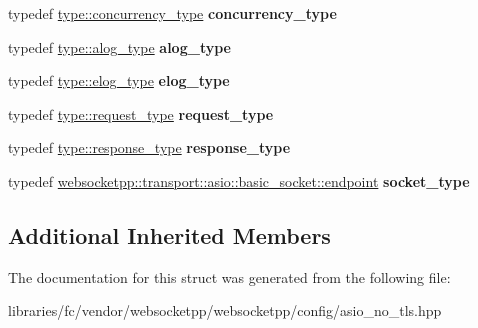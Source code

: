 \begin{DoxyCompactItemize}
\item 
\mbox{\label{structwebsocketpp_1_1config_1_1asio_1_1transport__config_a512d44142c4cf52cc732eb13e9901405}} 
typedef \mbox{\hyperlink{classwebsocketpp_1_1concurrency_1_1basic}{type\+::concurrency\+\_\+type}} {\bfseries concurrency\+\_\+type}
\item 
\mbox{\label{structwebsocketpp_1_1config_1_1asio_1_1transport__config_a524e5797844731f20c0513d6b4857b34}} 
typedef \mbox{\hyperlink{classwebsocketpp_1_1log_1_1basic}{type\+::alog\+\_\+type}} {\bfseries alog\+\_\+type}
\item 
\mbox{\label{structwebsocketpp_1_1config_1_1asio_1_1transport__config_a269e16af2262a7b1a9165e488b2dc651}} 
typedef \mbox{\hyperlink{classwebsocketpp_1_1log_1_1basic}{type\+::elog\+\_\+type}} {\bfseries elog\+\_\+type}
\item 
\mbox{\label{structwebsocketpp_1_1config_1_1asio_1_1transport__config_a5bd4b592ae10c2c5df22cf894c3db62b}} 
typedef \mbox{\hyperlink{classwebsocketpp_1_1http_1_1parser_1_1request}{type\+::request\+\_\+type}} {\bfseries request\+\_\+type}
\item 
\mbox{\label{structwebsocketpp_1_1config_1_1asio_1_1transport__config_ac6bbac6039c4723a7a59892b77437697}} 
typedef \mbox{\hyperlink{classwebsocketpp_1_1http_1_1parser_1_1response}{type\+::response\+\_\+type}} {\bfseries response\+\_\+type}
\item 
\mbox{\label{structwebsocketpp_1_1config_1_1asio_1_1transport__config_a7ad5fe6e1bb71633a8d75125a8388c43}} 
typedef \mbox{\hyperlink{classwebsocketpp_1_1transport_1_1asio_1_1basic__socket_1_1endpoint}{websocketpp\+::transport\+::asio\+::basic\+\_\+socket\+::endpoint}} {\bfseries socket\+\_\+type}
\end{DoxyCompactItemize}
\subsection*{Additional Inherited Members}


The documentation for this struct was generated from the following file\+:\begin{DoxyCompactItemize}
\item 
libraries/fc/vendor/websocketpp/websocketpp/config/asio\+\_\+no\+\_\+tls.\+hpp\end{DoxyCompactItemize}
